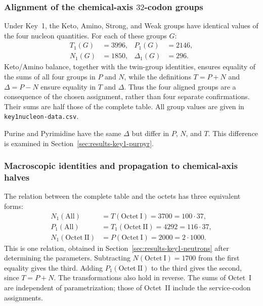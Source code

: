 \documentclass[11pt,a4paper]{article}
\renewcommand{\_}{\origunderscore\allowbreak}
\begin{document}
\subsubsection{Alignment of the chemical-axis \texorpdfstring{$32$}{32}-codon groups}
\label{sec:results-key1-axisalignment}

Under Key~1, the Keto, Amino, Strong, and Weak groups
have identical values of the four nucleon quantities.
For each of these groups $G$:
\[
\begin{aligned}
T_1(G)&=3996, & P_1(G)&=2146,\\
N_1(G)&=1850, & \Delta_1(G)&=296.
\end{aligned}
\]
Keto/Amino balance, together with the twin-group identities,
ensures equality of the sums of all four groups
in $P$ and $N$, while the definitions
$T=P+N$ and $\Delta=P-N$ ensure equality in $T$ and $\Delta$. Thus the four aligned groups are a
consequence of the chosen assignment, rather than four
separate confirmations. Their sums are half those of the
complete table. All group values are given in
\texttt{key1\_nucleon-data.csv}.

Purine and Pyrimidine have the same $\Delta$ but differ
in $P$, $N$, and $T$. This difference is examined in
Section~\ref{sec:results-key1-purpyr}.

\subsubsection{Macroscopic identities and propagation to chemical-axis halves}
\label{sec:results-key1-macroidentities}

The relation between the complete table and the octets
has three equivalent forms:
\begin{align*}
N_1(\mathrm{All})
&=T(\mathrm{Octet~I})=3700=100\cdot37,\\
P_1(\mathrm{All})
&=T_1(\mathrm{Octet~II})=4292=116\cdot37,\\
N_1(\mathrm{Octet~II})
&=P(\mathrm{Octet~I})=2000=2\cdot1000.
\end{align*}
This is one relation, obtained in
Section~\ref{sec:results-key1-neutrons} after determining
the parameters. Subtracting $N(\mathrm{Octet~I})=1700$
from the first equality gives the third. Adding
$P_1(\mathrm{Octet~II})$ to the third gives the second,
since $T=P+N$. The transformations also hold in reverse.
The sums of Octet~I are independent of parametrization;
those of Octet~II include the service-codon assignments.
\end{document}
